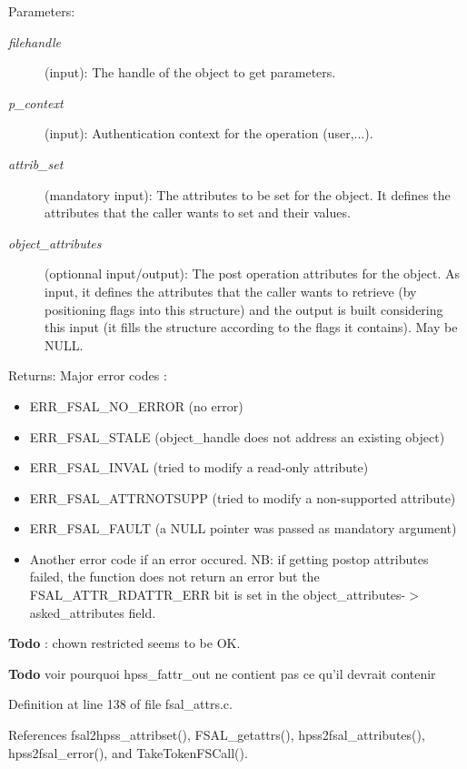 \begin{Desc}
\item[Parameters:]
\begin{description}
\item[{\em filehandle}](input): The handle of the object to get parameters. \item[{\em p\_\-context}](input): Authentication context for the operation (user,...). \item[{\em attrib\_\-set}](mandatory input): The attributes to be set for the object. It defines the attributes that the caller wants to set and their values. \item[{\em object\_\-attributes}](optionnal input/output): The post operation attributes for the object. As input, it defines the attributes that the caller wants to retrieve (by positioning flags into this structure) and the output is built considering this input (it fills the structure according to the flags it contains). May be NULL.\end{description}
\end{Desc}
\begin{Desc}
\item[Returns:]Major error codes :\begin{itemize}
\item ERR\_\-FSAL\_\-NO\_\-ERROR (no error)\item ERR\_\-FSAL\_\-STALE (object\_\-handle does not address an existing object)\item ERR\_\-FSAL\_\-INVAL (tried to modify a read-only attribute)\item ERR\_\-FSAL\_\-ATTRNOTSUPP (tried to modify a non-supported attribute)\item ERR\_\-FSAL\_\-FAULT (a NULL pointer was passed as mandatory argument)\item Another error code if an error occured. NB: if getting postop attributes failed, the function does not return an error but the FSAL\_\-ATTR\_\-RDATTR\_\-ERR bit is set in the object\_\-attributes-$>$asked\_\-attributes field. \end{itemize}
\end{Desc}


\begin{Desc}
\item[{\bf Todo}]: chown restricted seems to be OK. \end{Desc}


\begin{Desc}
\item[{\bf Todo}]voir pourquoi hpss\_\-fattr\_\-out ne contient pas ce qu'il devrait contenir \end{Desc}


Definition at line 138 of file fsal\_\-attrs.c.

References fsal2hpss\_\-attribset(), FSAL\_\-getattrs(), hpss2fsal\_\-attributes(), hpss2fsal\_\-error(), and TakeTokenFSCall().